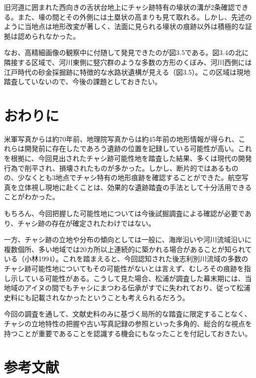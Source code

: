 \documentclass[a4j,11pt,twocolumn,openany]{jsbook}
\begin{document}
旧河道に囲まれた西向きの舌状台地上にチャシ跡特有の壕状の溝が2条確認できる。また、壕の間とその外側には土塁状の高まりも見て取れる。しかし、先述のように当地点は地形改変が著しく、法面に見られる壕状の痕跡以外は積極的な証拠は認められなかった。

なお、高精細画像の観察中に付随して発見できたのが図3.5である。図3.4の北に隣接する区域で、河川東側に竪穴群のような多数の方形のくぼみ、河川西側には江戸時代の砂金採掘跡に特徴的な水路状遺構が見える（図3.5）。この区域は現地踏査していないので、今後の課題としておきたい。

\section{おわりに}

米軍写真からは約70年前、地理院写真からは約45年前の地形情報が得られ、これらは開発前に存在したであろう遺跡の位置を記録している可能性が高い。これを根拠に、今回見出されたチャシ跡可能性地を踏査した結果、多くは現代の開発行為で削平され、損壊されたものが多かった。しかし、断片的ではあるものの、少なくとも3地点でチャシ特有の地形痕跡を確認することができた。航空写真を立体視し現地に赴くことは、効果的な遺跡踏査の手法として十分活用できることがわかった。

もちろん、今回把握した可能性地については今後試掘調査による確認が必要であり、チャシ跡の存在が確定されたわけではない。

一方、チャシ跡の立地や分布の傾向としては一般に、海岸沿いや河川流域沿いに複数個所、多い地域では20カ所以上連続的に築かれる場合があることが知られている（小林1994）。これを踏まえると、今回認知された後志利別川流域の多数のチャシ跡可能性地についてもその可能性がないとは言えず、むしろその痕跡を指し示している可能性がある。こうして見た場合、松浦が調査した幕末期には、当地域のアイヌの間でもチャシにまつわる伝承がすでに失われており、従って松浦史料にも記載されなかったということも考えられるだろう。

今回の調査を通して、文献史料のみに基づく局所的な踏査に限定することなく、チャシの立地特性の把握や古い写真記録の参照といった多角的、総合的な視点を持つことが重要であることを認識する機会にもなったことを付記しておきたい。

\section*{参考文献}
\end{document}
